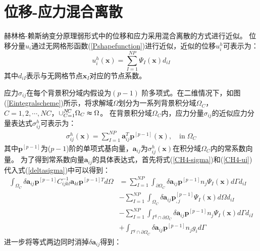 \section{位移-应力混合离散}
赫林格-赖斯纳变分原理弱形式中的位移和应力采用混合离散的方式进行近似。
位移分量$u_i$通过无网格形函数(\ref{Pshapefunction})进行近似，近似的位移$u^h_i$可表示为：
\begin{equation}\label{CH4-ui}
    u^h_i(\pmb{x})=\sum_{I=1}^{N\!P}\Psi_I(\pmb{x})d_{iI}
\end{equation}
其中$d_{iI}$表示与无网格节点$\pmb{x}_I$对应的节点系数。\par
应力$\sigma_{ij}$在每个背景积分域内假设为$(p-1)$ 阶多项式。在二维情况下，如图(\ref{Eintegralscheme})所示，将求解域$\Omega$划分为一系列背景积分域$\Omega_C$，$C=1,2,\dotsb,N\!C$，$\cup_{C=1}^{N\!C}\Omega_C\thickapprox\Omega$。
在背景积分域$\Omega_C$内，应力分量$\sigma_{ij}$的近似应力分量表达式$\sigma^h_{ij}$可表示为：
\begin{equation}\label{CH4-sigma}
\begin{split}
    \sigma^h_{ij}(\pmb{x})=\sum_{I=1}^{N\!P}\pmb{a}_{ij}^T\pmb{p}^{[p-1]}(\pmb{x}),\quad\text{in}\;\Omega_C
\end{split}
\end{equation}
其中$\pmb{p}^{[p-1]}$为($p-1$)阶的单项式基向量，$\pmb{a}_{ij}$为$\sigma_{ij}^h(\pmb{x})$在积分域$\Omega_C$内的常系数向量。
为了得到常系数向量$\pmb{a}_{ij}$的具体表达式，首先将式(\ref{CH4-sigma})和(\ref{CH4-ui})代入式(\ref{deltasigma})中可以得到：
\begin{equation}
\begin{split}
    \int_{\Omega_C}\delta\pmb{a}_{ij}\pmb{p}^{[p-1]}C^{-1}_{ijkl}\pmb{a}_{kl}\pmb{p}^{[p-1]T}d\Omega&=\sum_{I=1}^{N\!P}\int_{\partial\Omega_C}\delta\pmb{a}_{ij}\pmb{p}^{[p-1]}n_j\Psi_I(\pmb{x})d\Gamma d_{iI}\\
    &-\sum_{I=1}^{N\!P}\int_{\Omega_C}\delta\pmb{a}_{ij}\pmb{p}_{,j}^{[p-1]}\Psi_{I}(\pmb{x})d\Omega d_{iI}\\
     &-\sum_{I=1}^{N\!P}\int_{\Gamma^g\cap\partial\Omega_C}\delta\pmb{a}_{ij}\pmb{p}^{[p-1]}n_j\Psi_I(\pmb{x})d\Gamma d_{iI}\\
     &+\int_{\Gamma^g\cap\partial\Omega_C}\delta\pmb{a}_{ij}\pmb{p}^{[p-1]}n_jg_id\Gamma
\end{split}
\end{equation}
进一步将等式两边同时消掉$\delta\pmb{a}_{ij}$得到：
